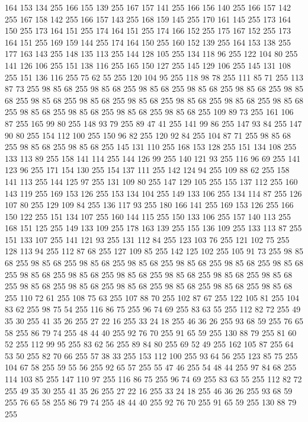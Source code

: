 164 153 134 255 166 155 139 255 167 157 141 255 166 156 140 255 166 157 142 255 167 158 142 255 166 157 143 255 168 159 145 255 170 161 145 255 173 164 150 255 173 164 151 255 174 164 151 255 174 166 152 255 175 167 152 255 173 164 151 255 169 159 144 255 174 164 150 255 160 152 139 255 164 153 138 255 177 163 143 255 148 135 113 255 144 128 105 255 134 118 96 255 122 104 80 255 141 126 106 255 151 138 116 255 165 150 127 255 145 129 106 255 145 131 108 255 151 136 116 255 75 62 55 255 120 104 95 255 118 98 78 255 111 85 71 255 113 87 73 255 98 85 68 255 98 85 68 255 98 85 68 255 98 85 68 255 98 85 68 255 98 85 68 255 98 85 68 255 98 85 68 255 98 85 68 255 98 85 68 255 98 85 68 255 98 85 68 255 98 85 68 255 98 85 68 255 98 85 68 255 98 85 68 255 109 89 73 255 161 106 87 255 165 99 80 255 148 93 79 255 89 47 41 255 141 99 86 255 147 93 84 255 147 90 80 255 154 112 100 255 150 96 82 255 120 92 84 255 104 87 71 255 98 85 68 255
98 85 68 255 98 85 68 255 145 131 110 255 168 153 128 255 151 134 108 255 133 113 89 255 158 141 114 255 144 126 99 255 140 121 93 255 116 96 69 255 141 123 96 255 171 154 130 255 154 137 111 255 142 124 94 255 109 88 62 255 158 141 113 255 144 125 97 255 131 109 80 255 147 129 105 255 155 137 112 255 160 143 119 255 169 153 126 255 153 134 104 255 149 133 106 255 134 114 87 255 126 107 80 255 129 109 84 255 136 117 93 255 180 166 141 255 169 153 126 255 166 150 122 255 151 134 107 255 160 144 115 255 150 133 106 255 157 140 113 255 168 151 125 255 149 133 109 255 178 163 139 255 155 136 109 255 133 113 87 255 151 133 107 255 141 121 93 255 131 112 84 255 123 103 76 255 121 102 75 255 128 113 94 255 112 87 68 255 127 109 85 255 142 125 102 255 105 91 73 255 98 85 68 255 98 85 68 255 98 85 68 255 98 85 68 255 98 85 68 255 98 85 68 255 98 85 68 255 98 85 68 255 98 85 68 255 98 85 68 255 98 85 68 255 98 85 68 255 98 85 68 255 98 85 68 255
98 85 68 255 98 85 68 255 98 85 68 255 98 85 68 255 98 85 68 255 110 72 61 255 108 75 63 255 107 88 70 255 102 87 67 255 122 105 81 255 104 83 62 255 98 75 54 255 116 86 75 255 96 74 69 255 83 63 55 255 112 82 72 255 49 35 30 255 41 35 26 255 27 22 16 255 33 24 18 255 46 36 26 255 93 68 59 255 76 65 58 255 86 79 74 255 48 44 40 255 92 76 70 255 91 65 59 255 130 88 79 255 81 60 52 255 112 99 95 255 83 62 56 255 89 84 80 255 69 52 49 255 162 105 87 255 64 53 50 255 82 70 66 255 57 38 33 255 153 112 100 255 93 64 56 255 123 85 75 255 104 67 58 255 59 55 56 255 92 65 57 255 55 47 46 255 54 48 44 255 97 84 68 255 114 103 85 255 147 110 97 255 116 86 75 255 96 74 69 255 83 63 55 255 112 82 72 255 49 35 30 255 41 35 26 255 27 22 16 255 33 24 18 255 46 36 26 255 93 68 59 255 76 65 58 255 86 79 74 255 48 44 40 255 92 76 70 255 91 65 59 255 130 88 79 255
